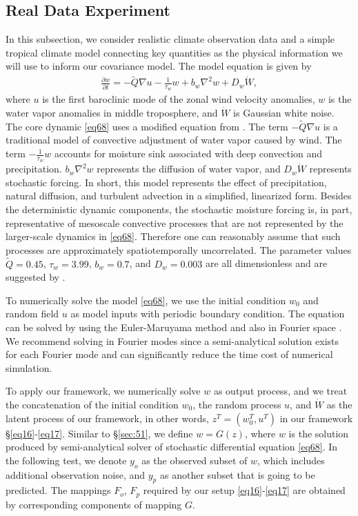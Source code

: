 \documentclass[article,ij4uq]{ij4uq}              %
\begin{document}
\subsection{Real Data Experiment}\label{ss:rde}
\par In this subsection, we consider realistic climate observation data and a simple tropical climate model connecting key quantities as the physical information we will use to inform our covariance model. The model equation is given by
\begin{align}
    \frac{\partial w}{\partial t}=-\tilde{Q}\nabla u - \frac{1}{\tau_{w}}w+b_{w}\nabla^{2}w+D_{w}\dot{W},\label{eq68}
\end{align}
where $u$ is the first baroclinic mode of the zonal wind velocity anomalies, $w$ is the water vapor anomalies in middle troposphere, and $\dot{W}$ is Gaussian white noise. The core dynamic \eqref{eq68} uses a modified equation from \cite{stechmann2017unified}. The term $-\tilde{Q}\nabla u$ is a traditional model of convective adjustment of water vapor caused by wind. The term $- \frac{1}{\tau_{w}}w$ accounts for moisture sink associated with deep convection and precipitation. $b_{w}\nabla^{2}w$ represents the diffusion of water vapor, and $D_{w}\dot{W}$ represents stochastic forcing. In short, this model represents the effect of precipitation, natural diffusion, and turbulent advection in a simplified, linearized form. Besides the deterministic dynamic components, the stochastic moisture forcing is, in part, representative of mesoscale convective processes that are not
represented by the larger-scale dynamics in \eqref{eq68}. Therefore one can reasonably assume that such processes are approximately spatiotemporally uncorrelated. The parameter values $\tilde{Q}=0.45$, $\tau_{w}=3.99$, $b_{w}=0.7$, and $D_{w}=0.003$ are all dimensionless and are suggested by \cite{stechmann2017unified}.
\par To numerically solve the model \eqref{eq68}, we use the initial condition $w_{0}$ and random field $u$ as model inputs with periodic boundary condition. The equation can be solved by using the Euler-Maruyama method \cite{kloeden2013numerical} and also in Fourier space \cite{appliedSDE}. We recommend  solving in Fourier modes since a semi-analytical solution \cite{appliedSDE} exists for each Fourier mode and can significantly reduce the time cost of numerical simulation.
\par To apply our framework, we numerically solve $w$ as output process, and we treat the concatenation of the initial condition $w_{0}$, the random process $u$, and $\dot{W}$ as the latent process of our framework, in other words, $z^{T}=(w_{0}^{T},u^{T})$ in our framework \S \eqref{eq16}-\eqref{eq17}. Similar to \S \ref{sec:51}, we define $w=G(z)$, where $w$ is the solution produced by semi-analytical solver of stochastic differential equation \eqref{eq68}. In the following test, we denote $y_{o}$ as the observed subset of $w$, which  includes additional observation noise, and $y_{p}$ as another subset that is going to be predicted. The mappings $F_{o}$, $F_{p}$ required by our setup \eqref{eq16}-\eqref{eq17} are obtained by corresponding components of mapping $G$.
\end{document}
